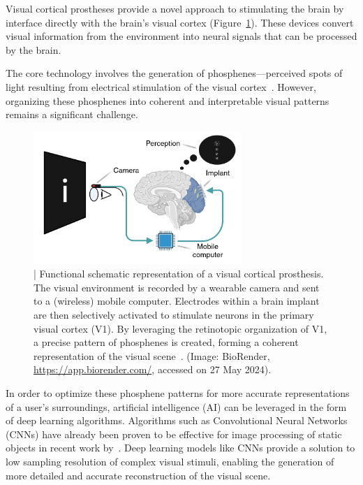 \documentclass[10pt]{article}
\begin{document}
Visual cortical prostheses provide a novel approach to stimulating the brain by
interface directly with the brain's visual
cortex (Figure~\ref{fig:schematic}).
These devices convert visual information from the environment into neural
signals that can be processed by the brain.

The core technology involves the generation of phosphenes—perceived spots of
light resulting from electrical stimulation of the visual
cortex~\parencite{vandergrintenBiologicallyPlausiblePhosphene2024}. However,
organizing these phosphenes into coherent and interpretable visual patterns
remains a significant challenge.

\begin{figure}[ht!]
  \centering
  \includegraphics[width=0.7\textwidth]{imgs/visual_cortical_prothesis.png}
  \caption{| Functional schematic representation of a visual cortical
    prosthesis. The visual environment is recorded by a wearable camera
    and sent to a (wireless) mobile computer. Electrodes within a brain
    implant are then selectively activated to stimulate neurons in the
    primary visual cortex (V1). By leveraging the retinotopic
    organization of V1, a precise pattern of phosphenes is created,
    forming a coherent representation of the visual
    scene~\parencite{chenShapePerceptionHighchannelcount2020}. (Image:
    BioRender,
    \href{https://app.biorender.com/}{https://app.biorender.com/},
    accessed on 27 May 2024).}\label{fig:schematic}
\end{figure}

In order to optimize these phosphene patterns for more accurate representations
of a user's surroundings, artificial intelligence (AI) can be leveraged in the
form of deep learning algorithms. Algorithms such as Convolutional Neural
Networks (CNNs) have already been proven to be effective for image processing of
static objects in recent work
by~\textcite{deruytervansteveninckEndtoendOptimizationProsthetic2022}. Deep
learning models like CNNs provide a solution to low sampling resolution of
complex visual stimuli, enabling the generation of more detailed and accurate
reconstruction of the visual scene.
\end{document}
